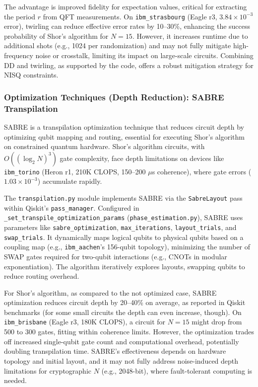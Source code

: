 \documentclass[conference,twoside]{IEEEtran}
\begin{document}
The advantage is improved fidelity for expectation values, critical for extracting the period \( r \) from QFT measurements. On \texttt{ibm\_strasbourg} (Eagle r3, \(3.84 \times 10^{-3}\) error), twirling can reduce effective error rates by 10–30\%, enhancing the success probability of Shor's algorithm for \( N = 15 \). However, it increases runtime due to additional shots (e.g., 1024 per randomization) and may not fully mitigate high-frequency noise or crosstalk, limiting its impact on large-scale circuits. Combining DD and twirling, as supported by the code, offers a robust mitigation strategy for NISQ constraints.

\subsubsection{Optimization Techniques (Depth Reduction): SABRE Transpilation}
SABRE is a transpilation optimization technique that reduces circuit depth by optimizing qubit mapping and routing, essential for executing Shor's algorithm on constrained quantum hardware\citep*{li2019}. Shor's algorithm circuits, with \( O((\log_2 N)^3) \) gate complexity, face depth limitations on devices like \texttt{ibm\_torino} (Heron r1, 210K CLOPS, 150–200 \(\mu\)s coherence), where gate errors (\(1.03 \times 10^{-3}\)) accumulate rapidly.

The \texttt{transpilation.py} module implements SABRE via the \texttt{SabreLayout} pass within Qiskit’s \texttt{pass\_manager}. Configured in \texttt{\_set\_transpile\_optimization\_params} (\texttt{phase\_estimation.py}), SABRE uses parameters like \texttt{sabre\_optimization}, \texttt{max\_iterations}, \texttt{layout\_trials}, and \texttt{swap\_trials}. It dynamically maps logical qubits to physical qubits based on a coupling map (e.g., \texttt{ibm\_aachen}’s 156-qubit topology), minimizing the number of SWAP gates required for two-qubit interactions (e.g., CNOTs in modular exponentiation). The algorithm iteratively explores layouts, swapping qubits to reduce routing overhead.

For Shor's algorithm, as compared to the not optimized case, SABRE optimization reduces circuit depth by 20–40\% on average, as reported in Qiskit benchmarks (for some small circuits the depth can even increase, though). On \texttt{ibm\_brisbane} (Eagle r3, 180K CLOPS), a circuit for \( N = 15 \) might drop from 500 to 300 gates, fitting within coherence limits. However, the optimization trades off increased single-qubit gate count and computational overhead, potentially doubling transpilation time. SABRE’s effectiveness depends on hardware topology and initial layout, and it may not fully address noise-induced depth limitations for cryptographic \( N \) (e.g., 2048-bit), where fault-tolerant computing is needed.
\end{document}
